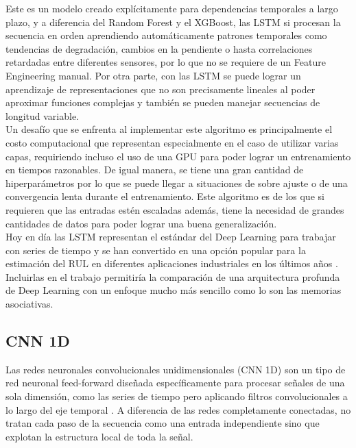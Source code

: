 Este es un modelo creado explícitamente para dependencias temporales a largo plazo, y a diferencia del Random Forest y el XGBoost, las LSTM si procesan la secuencia en orden aprendiendo automáticamente patrones temporales como tendencias de degradación, cambios en la pendiente o hasta correlaciones retardadas entre diferentes sensores, por lo que no se requiere de un Feature Engineering manual. Por otra parte, con las LSTM se puede lograr un aprendizaje de representaciones que no son precisamente lineales al poder aproximar funciones complejas y también se pueden manejar secuencias de longitud variable.\\[.15cm]

Un desafío que se enfrenta al implementar este algoritmo es principalmente el costo computacional que representan especialmente en el caso de utilizar varias capas, requiriendo incluso el uso de una GPU para poder lograr un entrenamiento en tiempos razonables. De igual manera, se tiene una gran cantidad de hiperparámetros por lo que se puede llegar a situaciones de sobre ajuste o de una convergencia lenta durante el entrenamiento. Este algoritmo es de los que si requieren que las entradas estén escaladas además, tiene la necesidad de grandes cantidades de datos para poder lograr una buena generalización.\\[.15cm]


Hoy en día las LSTM representan el estándar del Deep Learning para trabajar con series de tiempo y se han convertido en una opción popular para la estimación del RUL en diferentes aplicaciones industriales en los últimos años \cite{wu2018}. Incluirlas en el trabajo permitiría la comparación de una arquitectura profunda de Deep Learning con un enfoque mucho más sencillo como lo son las memorias asociativas.

\subsection{CNN 1D}

Las redes neuronales convolucionales unidimensionales (CNN 1D) son un tipo de red neuronal feed-forward diseñada específicamente para procesar señales de una sola dimensión, como las series de tiempo pero aplicando filtros convolucionales a lo largo del eje temporal \cite{kiranyaz2021}. A diferencia de las redes completamente conectadas, no tratan cada paso de la secuencia como una entrada independiente sino que explotan la estructura local de toda la señal.

